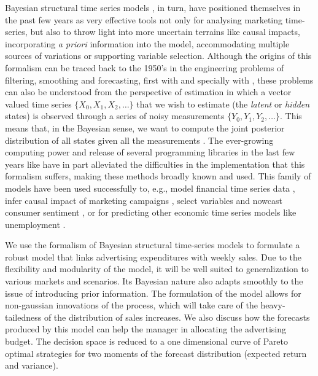 Bayesian structural time series models \parencite{scott2014predicting}, in turn, have positioned themselves in the past few years as very effective tools  not only for analysing marketing time-series, but also to throw light into more uncertain terrains like  causal impacts, incorporating \emph{a priori} information into the model, accommodating multiple sources of variations or supporting variable selection. Although the origins of this formalism can be traced back to the 1950's in the engineering problems of filtering, smoothing and forecasting, first with \textcite{wiener1949extrapolation} and specially with \textcite{kalman1960new}, these problems can also be understood from the perspective of estimation in which a vector valued time series $\{ X_0, X_1, X_2, \ldots\}$ that we wish to estimate (the \emph{latent} or \emph{hidden} states) is observed through a series of noisy measurements $\{ Y_0, Y_1, Y_2, \ldots\}$. This  means that, in the Bayesian sense, we want to compute the joint posterior distribution of all  states given all the measurements \parencite{sarkka2013bayesian}. The ever-growing computing power and release of several programming libraries  in the last few years like \parencite{petris2010r, scott2016bsts} have in part alleviated the difficulties in the implementation  that this formalism suffers, making these methods broadly known and used. This family of models have been used successfully to, e.g., model financial time series data \parencite{doi:10.1002/asmb.428}, infer causal impact of marketing campaigns \parencite{brodersen2015inferring}, select variables and nowcast consumer sentiment  \parencite{scott2015bayesian}, or for predicting other economic time series models like unemployment \parencite{scott2014predicting}.

We use the formalism of Bayesian structural time-series models to formulate a robust model that links advertising expenditures with weekly sales. Due to the flexibility and modularity of the model, it will be well suited to generalization to various markets and scenarios. Its Bayesian nature also adapts smoothly to the issue of introducing prior information. The formulation of the model allows for non-gaussian innovations of the process, which will take care of the heavy-tailedness of the distribution of sales increases. We also discuss how the forecasts produced by this model can help the manager in allocating the advertising budget. The decision space is reduced to a one dimensional curve of Pareto optimal strategies for  two moments of the forecast distribution (expected return and variance).

